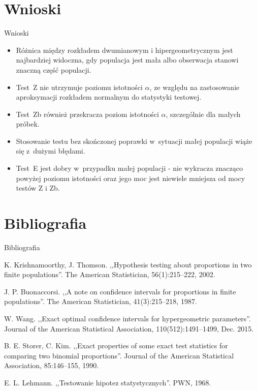 \documentclass{beamer}
\newcommand{\1}[1]{\mathds{1}\left(#1\right)}
\begin{document}
\section{Wnioski}
\begin{frame}{Wnioski}
\begin{itemize} [<+->]
\item Różnica między rozkładem dwumianowym i hipergeometrycznym jest najbardziej widoczna, gdy populacja jest mała albo obserwacja stanowi znaczną część populacji.
\item Test~Z nie utrzymuje poziomu istotności $\alpha$, ze względu na zastosowanie aproksymacji rozkładem normalnym do statystyki testowej.
\item Test~Zb również przekracza poziom istotności $\alpha$, szczególnie dla małych próbek.
\item Stosowanie testu bez skończonej poprawki w~sytuacji małej populacji wiąże się z~dużymi błędami.
\item Test~E jest dobry w~przypadku małej populacji - nie wykracza znacząco powyżej poziomu istotności oraz jego moc jest niewiele mniejsza od mocy testów Z i Zb.
\end{itemize}
\end{frame}

\section{Bibliografia}
\begin{frame}{Bibliografia}
\begin{thebibliography}{9}
	\beamertemplatearticlebibitems
	K. Krishnamoorthy, J. Thomson. ,,Hypothesis testing about proportions in two
	finite populations''. The American Statistician, 56(1):215–222, 2002.
	
	J. P. Buonaccorsi. ,,A note on confidence intervals for proportions in finite
	populations''. The American Statistician, 41(3):215–218, 1987.
	

	W. Wang. ,,Exact optimal confidence intervals for hypergeometric parameters''.
	Journal of the American Statistical Association, 110(512):1491–1499, Dec.
	2015.
	
	B. E. Storer, C. Kim. ,,Exact properties of some exact test statistics for comparing
	two binomial proportions''. Journal of the American Statistical Association,
	85:146–155, 1990.
	
	\beamertemplatebookbibitems
	E. L. Lehmann. ,,Testowanie hipotez statystycznych''. PWN, 1968.
	
\end{thebibliography}
\end{frame}
\end{document}
